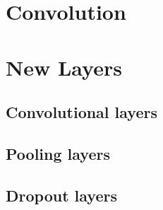 %
%

\section{Convolution}
\section{New Layers}
    \subsection{Convolutional layers}
    \subsection{Pooling layers}
    \subsection{Dropout layers}